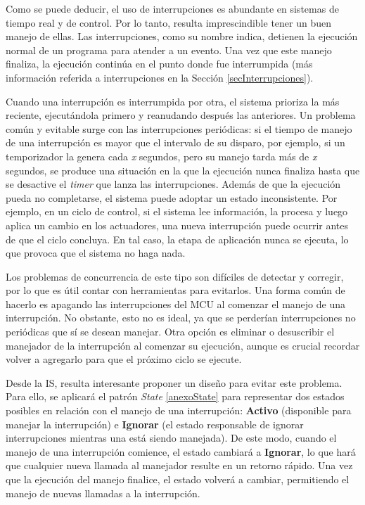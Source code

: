 Como se puede deducir, el uso de interrupciones es abundante en sistemas de tiempo real y de control. Por lo tanto, resulta imprescindible tener un buen manejo de ellas. Las interrupciones, como su nombre indica, detienen la ejecución normal de un programa para atender a un evento. Una vez que este manejo finaliza, la ejecución continúa en el punto donde fue interrumpida (más información referida a interrupciones en la Sección \ref{secInterrupciones}).

Cuando una interrupción es interrumpida por otra, el sistema prioriza la más reciente, ejecutándola primero y reanudando después las anteriores. Un problema común y evitable surge con las interrupciones periódicas: si el tiempo de manejo de una interrupción es mayor que el intervalo de su disparo, por ejemplo, si un temporizador la genera cada \textit{x} segundos, pero su manejo tarda más de \textit{x} segundos, se produce una situación en la que la ejecución nunca finaliza hasta que se desactive el \textit{timer} que lanza las interrupciones. Además de que la ejecución pueda no completarse, el sistema puede adoptar un estado inconsistente. Por ejemplo, en un ciclo de control, si el sistema lee información, la procesa y luego aplica un cambio en los actuadores, una nueva interrupción puede ocurrir antes de que el ciclo concluya. En tal caso, la etapa de aplicación nunca se ejecuta, lo que provoca que el sistema no haga nada.

Los problemas de concurrencia de este tipo son difíciles de detectar y corregir, por lo que es útil contar con herramientas para evitarlos. Una forma común de hacerlo es apagando las interrupciones del \gls{MCU} al comenzar el manejo de una interrupción. No obstante, esto no es ideal, ya que se perderían interrupciones no periódicas que sí se desean manejar. Otra opción es eliminar o desuscribir el manejador de la interrupción al comenzar su ejecución, aunque es crucial recordar volver a agregarlo para que el próximo ciclo se ejecute.

Desde la \gls{IS}, resulta interesante proponer un diseño para evitar este problema. Para ello, se aplicará el patrón \textit{State} \ref{anexoState} para representar dos estados posibles en relación con el manejo de una interrupción: \textbf{Activo} (disponible para manejar la interrupción) e \textbf{Ignorar} (el estado responsable de ignorar interrupciones mientras una está siendo manejada). De este modo, cuando el manejo de una interrupción comience, el estado cambiará a \textbf{Ignorar}, lo que hará que cualquier nueva llamada al manejador resulte en un retorno rápido. Una vez que la ejecución del manejo finalice, el estado volverá a cambiar, permitiendo el manejo de nuevas llamadas a la interrupción.

